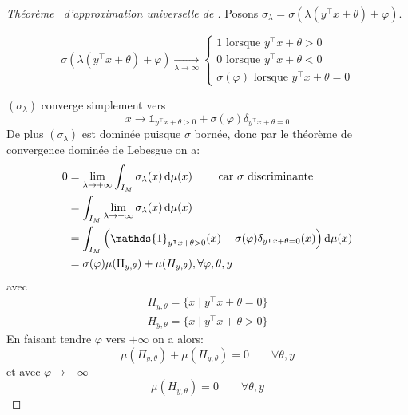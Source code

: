 \begin{proof}[Théorème~\label{cybenko} d'approximation universelle de \citet{Cybenko}]
    Posons $\sigma_\lambda = \sigma(\lambda ( y^\intercal x +\theta ) + \varphi)$.
    
    \begin{equation*}
        \sigma(\lambda ( y^\intercal x +\theta ) + \varphi) \xrightarrow[\lambda \to \infty]{} \begin{cases}
            1 \text{ lorsque } y^\intercal x +\theta > 0 \\
            0 \text{ lorsque } y^\intercal x +\theta < 0 \\
            \sigma (\varphi) \text{ lorsque } y^\intercal x +\theta = 0
        \end{cases}
    \end{equation*}
    
    $(\sigma_\lambda)$ converge simplement vers
    \begin{equation*}
        x \rightarrow \mathds{1}_{y^\intercal x + \theta > 0} + \sigma (\varphi) \delta_{y^\intercal x + \theta = 0}
    \end{equation*}
    De plus $(\sigma_\lambda)$ est dominée puisque $\sigma$ bornée, donc par le théorème de convergence dominée de Lebesgue on a:
    \begin{align*}
        0 &= \lim_{\lambda \to +\infty} \int_{I_M} \sigma_\lambda (x) \diff \mu (x) \qquad \text{ car } \sigma \text{ discriminante}\\
        &= \int_{I_M} \lim_{\lambda \to +\infty} \sigma_\lambda (x) \diff \mu (x) \\
        &= \int_{I_M} \left( \mathds{1}_{y^\intercal x + \theta > 0}(x) + \sigma (\varphi) \delta_{y^\intercal x + \theta = 0}(x) \right) \diff \mu (x) \\
        &= \sigma(\varphi) \mu(\Pi_{y,\theta}) + \mu (H_{y,\theta}) , \forall \varphi, \theta, y
    \end{align*}
    avec
    \begin{gather*}
        \Pi_{y,\theta} = \{ x \mid y^\intercal x + \theta = 0 \} \\
        H_{y,\theta} = \{ x \mid y^\intercal x + \theta > 0 \}
    \end{gather*}
    En faisant tendre $\varphi$ vers $+\infty$ on a alors:
    \begin{equation*}
        \mu(\Pi_{y,\theta}) + \mu (H_{y,\theta}) = 0 \qquad \forall \theta, y
    \end{equation*}
    et avec $\varphi \to -\infty$
    \begin{equation*}
        \mu (H_{y,\theta}) = 0 \qquad \forall \theta, y

\end{equation*}
\end{proof}
